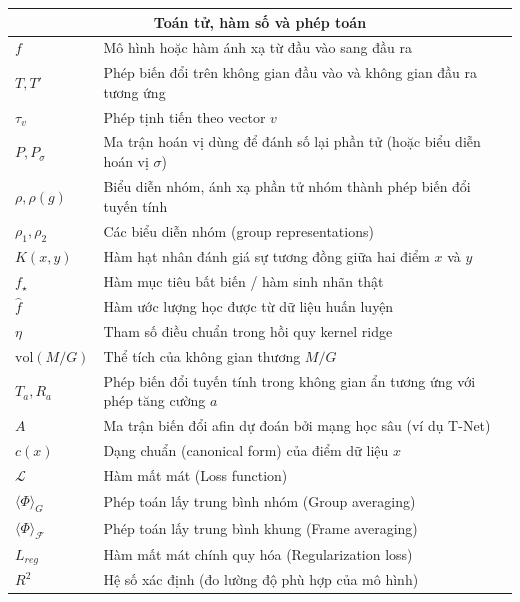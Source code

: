 \documentclass[oneside]{hcmus-report}
\theoremstyle{plain}
\theoremstyle{definition}
\begin{document}
\begin{longtable}{p{} p{}}
\hline

\multicolumn{2}{c}{\textbf{Toán tử, hàm số và phép toán}} \\
\hline
$f$ & Mô hình hoặc hàm ánh xạ từ đầu vào sang đầu ra \\
$T, T'$ & Phép biến đổi trên không gian đầu vào và không gian đầu ra tương ứng \\
$\tau_v$ & Phép tịnh tiến theo vector $v$ \\
$P, P_\sigma$ & Ma trận hoán vị dùng để đánh số lại phần tử (hoặc biểu diễn hoán vị $\sigma$) \\
$\rho, \rho(g)$ & Biểu diễn nhóm, ánh xạ phần tử nhóm thành phép biến đổi tuyến tính \\
$\rho_1, \rho_2$ & Các biểu diễn nhóm (group representations) \\
$K(x, y)$ & Hàm hạt nhân đánh giá sự tương đồng giữa hai điểm $x$ và $y$ \\
$f_{\star}$ & Hàm mục tiêu bất biến / hàm sinh nhãn thật \\
$\hat{f}$ & Hàm ước lượng học được từ dữ liệu huấn luyện \\
$\eta$ & Tham số điều chuẩn trong hồi quy kernel ridge \\
$\mathrm{vol}(M/G)$ & Thể tích của không gian thương $M/G$ \\
$T_a, R_a$ & Phép biến đổi tuyến tính trong không gian ẩn tương ứng với phép tăng cường $a$ \\
$A$ & Ma trận biến đổi afin dự đoán bởi mạng học sâu (ví dụ T-Net) \\
$c(x)$ & Dạng chuẩn (canonical form) của điểm dữ liệu $x$ \\
$\mathcal{L}$ & Hàm mất mát (Loss function) \\
$\langle \Phi \rangle_G$ & Phép toán lấy trung bình nhóm (Group averaging) \\
$\langle \Phi \rangle_{\mathcal{F}}$ & Phép toán lấy trung bình khung (Frame averaging) \\
$L_{reg}$ & Hàm mất mát chính quy hóa (Regularization loss) \\
$R^2$ & Hệ số xác định (đo lường độ phù hợp của mô hình) \\

\hline


\end{longtable}
\end{document}
